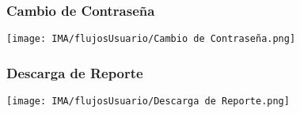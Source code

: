 \newpage
\subsubsection*{Cambio de Contraseña}
\begin{center}
    \texttt{[image: IMA/flujosUsuario/Cambio de Contraseña.png]}
\end{center}

\newpage
\subsubsection*{Descarga de Reporte}
\begin{center}
    \texttt{[image: IMA/flujosUsuario/Descarga de Reporte.png]}
\end{center}